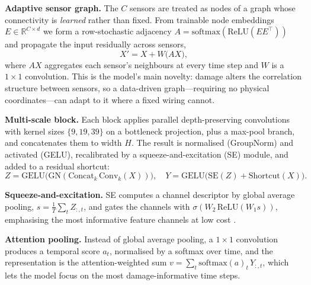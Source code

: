 \documentclass[11pt]{article}
\begin{document}
\textbf{Adaptive sensor graph.} The $C$ sensors are treated as nodes of a graph
whose connectivity is \emph{learned} rather than fixed. From trainable node
embeddings $E\in\mathbb{R}^{C\times d}$ we form a row-stochastic adjacency
$A=\mathrm{softmax}(\mathrm{ReLU}(E E^{\top}))$ and propagate the input
residually across sensors,
\begin{equation}
  X' = X + W\big(A X\big),
\end{equation}
where $AX$ aggregates each sensor's neighbours at every time step and $W$ is a
$1{\times}1$ convolution. This is the model's main novelty: damage alters the
correlation structure between sensors, so a data-driven graph---requiring no
physical coordinates---can adapt to it where a fixed wiring cannot.

\textbf{Multi-scale block.} Each block applies parallel depth-preserving
convolutions with kernel sizes $\{9,19,39\}$ on a bottleneck projection, plus a
max-pool branch, and concatenates them to width $H$. The result is normalised
(GroupNorm) and activated (GELU), recalibrated by a squeeze-and-excitation (SE)
module, and added to a residual shortcut:
\begin{equation}
  Z = \mathrm{GELU}\!\big(\mathrm{GN}(\mathrm{Concat}_k\,\mathrm{Conv}_k(X))\big),
  \quad
  Y = \mathrm{GELU}\!\big(\mathrm{SE}(Z) + \mathrm{Shortcut}(X)\big).
\end{equation}

\textbf{Squeeze-and-excitation.} SE computes a channel descriptor by global
average pooling, $s = \tfrac{1}{T}\sum_t Z_{:,t}$, and gates the channels with
$\sigma(W_2\,\mathrm{ReLU}(W_1 s))$, emphasising the most informative feature
channels at low cost \cite{hu2018squeeze}.

\textbf{Attention pooling.} Instead of global average pooling, a $1{\times}1$
convolution produces a temporal score $a_t$, normalised by a softmax over time,
and the representation is the attention-weighted sum
$v = \sum_t \mathrm{softmax}(a)_t\, Y_{:,t}$, which lets the model focus on the
most damage-informative time steps.
\end{document}
